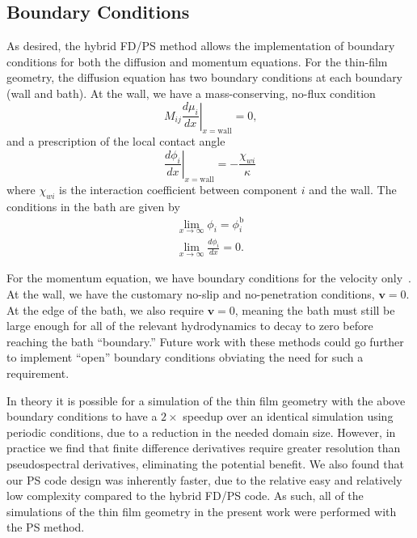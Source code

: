 \documentclass[journal=mamobx,manuscript=suppinfo]{achemso}
\newcommand{\txtb}{\mathrm{b}}
\begin{document}
\subsection{Boundary Conditions} \label{sec:BCs}
As desired, the hybrid FD/PS method allows the implementation of boundary conditions for both the diffusion and momentum equations.
For the thin-film geometry, the diffusion equation has two boundary conditions at each boundary (wall and bath).
At the wall, we have a mass-conserving, no-flux condition
\begin{equation}
M_{ij} \left . \frac{d \mu_{i}}{d x} \right |_{x = \mathrm{wall}} = 0 \textrm{,}
\end{equation}
and a prescription of the local contact angle 
\begin{equation}
\left . \frac{d \phi_{i}}{d x} \right |_{x = \mathrm{wall}} = -\frac{\chi_{wi}}{\kappa}
\end{equation}
where $\chi_{wi}$ is the interaction coefficient between component $i$ and the wall.
The conditions in the bath are given by
\begin{gather}
\lim_{x\rightarrow\infty} \phi_{i} = \phi_{i}^{\txtb} \\
\lim_{x\rightarrow\infty} \frac{d \phi_{i}}{dx} = 0 \textrm{.}
\end{gather}

For the momentum equation, we have boundary conditions for the velocity only~\cite{Rempfer2006}.
At the wall, we have the customary no-slip and no-penetration conditions, $\bm{v} = 0$.
At the edge of the bath, we also require $\bm{v} = 0$, meaning the bath must still be large enough for all of the relevant hydrodynamics to decay to zero before reaching the bath ``boundary.''
Future work with these methods could go further to implement ``open'' boundary conditions obviating the need for such a requirement.

In theory it is possible for a simulation of the thin film geometry with the above boundary conditions to have a $2\times$ speedup over an identical simulation using periodic conditions, due to a reduction in the needed domain size.
However, in practice we find that finite difference derivatives require greater resolution than pseudospectral derivatives, eliminating the potential benefit.
We also found that our PS code design was inherently faster, due to the relative easy and relatively low complexity compared to the hybrid FD/PS code.
As such, all of the simulations of the thin film geometry in the present work were performed with the PS method.
\end{document}
